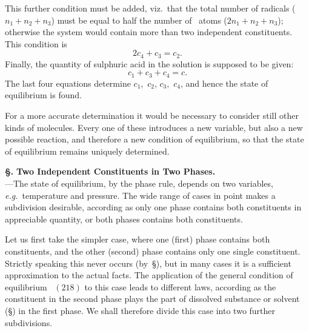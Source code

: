 \documentclass[12pt]{book}[2005/09/16]
\newcommand{\Chg}[2]{#2}
\newcommand{\Section}[1]{
  \medskip\par\textbf{§\;#1}
  \label{section:#1}
}
\newcommand{\SecRef}[2][§\;]{\hyperref[section:#2.]{{\upshape #1#2}}}
\newcommand{\Eq}[1]{%
  \hyperref[eqn:#1]{\ensuremath{#1}}%
}
\newcommand{\PageSep}[1]{\ignorespaces}
\newcommand{\Topic}[1]{\textbf{#1}}
\newcommand{\eg}{\emph{e.g.}}
\begin{document}
This further condition must be added, viz.\ that the total
number of  radicals ($n_{1} + n_{2} + n_{3}$) must be equal to half
the number of ~atoms ($2n_{1} + n_{2} + n_{3}$); otherwise the
system would contain more than two independent constituents.
This condition is
\[
2c_{4} + c_{3} = c_{2}.
\]
Finally, the quantity of sulphuric acid in the solution is
supposed to be given:
\[
c_{1} + c_{3} + c_{4} = c.
\]
\PageSep{240}
The last four equations determine $c_{1}$,~$c_{2}$, $c_{3}$,~$c_{4}$, and hence the
state of equilibrium is found.

For a more accurate determination it would be necessary
to consider still other kinds of molecules. Every one of
these introduces a new variable, but also a new possible
reaction, and therefore a new condition of equilibrium, so
that the state of equilibrium remains uniquely determined.

\Section{264.} \Topic{Two Independent Constituents in Two Phases.}\\
---The state of equilibrium, by the phase rule, depends on
two variables, \eg\ temperature and pressure. The wide range
of cases in point makes a subdivision desirable, according as
only one phase contains both constituents in appreciable
quantity, or both phases contains both constituents.

Let us first take the simpler case, where one (first) phase
contains both constituents, and the other (second) phase
contains only one single constituent. Strictly speaking
this never occurs (by~\Chg{259}{\SecRef{259}}), but in many cases it is a sufficient
approximation to the actual facts. The application
of the general condition of equilibrium~\Eq{(218)} to this case
leads to different laws, according as the constituent in the
second phase plays the part of dissolved substance or solvent
(\SecRef{249}) in the first phase. We shall therefore divide this
case into two further subdivisions.
\end{document}

